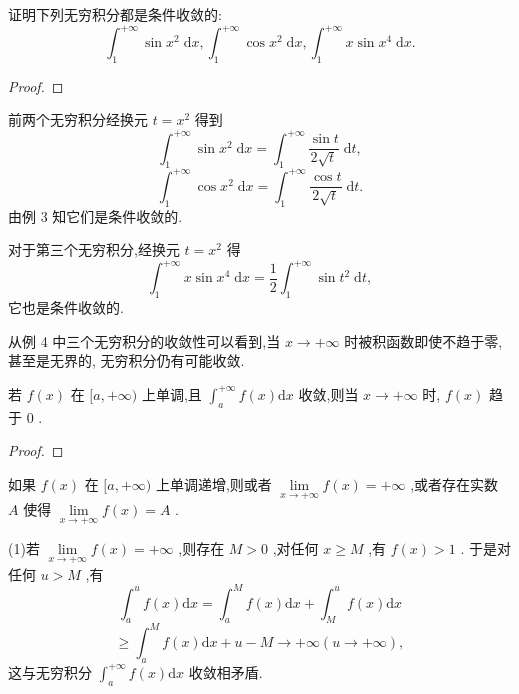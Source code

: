 \begin{example}

\end{example}
证明下列无穷积分都是条件收敛的:
\[
{\int }_{1}^{+\infty }\sin {x}^{2}\mathrm{\;d}x,{\int }_{1}^{+\infty }\cos {x}^{2}\mathrm{\;d}x,{\int }_{1}^{+\infty }x\sin {x}^{4}\mathrm{\;d}x.
\]
\begin{proof}

\end{proof}
前两个无穷积分经换元 \(t = {x}^{2}\) 得到
\[
{\int }_{1}^{+\infty }\sin {x}^{2}\mathrm{\;d}x = {\int }_{1}^{+\infty }\frac{\sin t}{2\sqrt{t}}\mathrm{\;d}t,
\]
\[
{\int }_{1}^{+\infty }\cos {x}^{2}\mathrm{\;d}x = {\int }_{1}^{+\infty }\frac{\cos t}{2\sqrt{t}}\mathrm{\;d}t.
\]
由例 3 知它们是条件收敛的.

对于第三个无穷积分,经换元 \(t = {x}^{2}\) 得
\[
{\int }_{1}^{+\infty }x\sin {x}^{4}\mathrm{\;d}x = \frac{1}{2}{\int }_{1}^{+\infty }\sin {t}^{2}\mathrm{\;d}t,
\]
它也是条件收敛的.

从例 4 中三个无穷积分的收敛性可以看到,当 \(x \rightarrow   + \infty\) 时被积函数即使不趋于零, 甚至是无界的, 无穷积分仍有可能收敛.

\begin{example}

\end{example}
若 \(f\left( x\right)\) 在 \(\lbrack a, + \infty )\) 上单调,且 \({\int }_{a}^{+\infty }f\left( x\right) \mathrm{d}x\) 收敛,则当 \(x \rightarrow   + \infty\) 时, \(f\left( x\right)\) 趋于 0 .

\begin{proof}

\end{proof}
如果 \(f\left( x\right)\) 在 \(\lbrack a, + \infty )\) 上单调递增,则或者 \(\mathop{\lim }\limits_{{x \rightarrow   + \infty }}f\left( x\right)  =  + \infty\) ,或者存在实数 \(A\) 使得 \(\mathop{\lim }\limits_{{x \rightarrow   + \infty }}f\left( x\right)  = A\) .

(1)若 \(\mathop{\lim }\limits_{{x \rightarrow   + \infty }}f\left( x\right)  =  + \infty\) ,则存在 \(M > 0\) ,对任何 \(x \geq  M\) ,有 \(f\left( x\right)  > 1\) . 于是对任何 \(u > M\) ,有
\[
{\int }_{a}^{u}f\left( x\right) \mathrm{d}x = {\int }_{a}^{M}f\left( x\right) \mathrm{d}x + {\int }_{M}^{u}f\left( x\right) \mathrm{d}x
\]
\[
\geq  {\int }_{a}^{M}f\left( x\right) \mathrm{d}x + u - M \rightarrow   + \infty \left( {u \rightarrow   + \infty }\right) ,
\]
这与无穷积分 \({\int }_{a}^{+\infty }f\left( x\right) \mathrm{d}x\) 收敛相矛盾.

